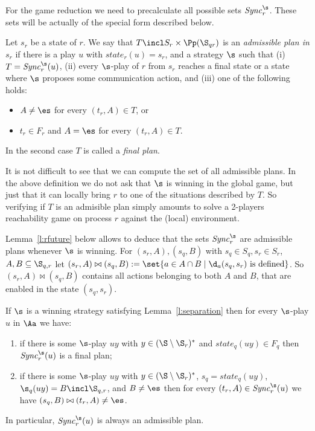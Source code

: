 \documentclass{llncs}
\newcommand{\Sync}{\mathit{Sync}}
\newcommand{\state}{\mathit{state}}
\begin{document}
For the game reduction we need to precalculate all possible sets
$\Sync^\s_r$. These sets will be actually of the special form
described below. 


\begin{definition}
  Let $s_r$ be a state of $r$.  We say that $T\incl
  S_r\times\Pp(\S_{qr})$ is an \emph{admissible plan in $s_r$} if
  there is a play $u$ with $\state_r(u)=s_r$, and a strategy $\s$ such
  that (i) $T=\Sync^\s_r(u)$, (ii) every $\s$-play of $r$ from $s_r$
  reaches a final state or a state where $\s$ proposes some communication
  action, and (iii) one of the following holds:
  \begin{itemize}
  \item $A\not=\es$ for every $(t_r,A)\in T$, or
    \item $t_r \in F_r$ and $A=\es$ for every $(t_r,A)\in T$.
  \end{itemize}
  In the second case $T$ is called a \emph{final plan}.
\end{definition}


It is not difficult to see that we can compute the set of all
admissible plans. In the above definition we do not ask that $\s$ is
winning in the global game, but just that it can locally bring $r$ to one
of the situations described by $T$. So verifying if $T$ is an
admisible plan simply amounts  to solve a 2-players reachability game on process
$r$ against the (local) environment.

Lemma~\ref{l:rfuture} below allows to deduce that the sets $\Sync_r^\s$
are admissible plans whenever $\s$ is winning. For $(s_r,A), (s_q,B)$ with $s_q \in S_q, s_r \in
S_r$, $A,B \subseteq \S_{q,r}$ let $(s_r,A) \bowtie (s_q,B):=\set{a
  \in A \cap B \mid \d_a(s_q,s_r) \text{ is defined}}$. So $(s_r,A)
\bowtie (s_q,B)$ contains all actions belonging to both $A$ and $B$,
that are enabled in the state $(s_q,s_r)$.



\begin{lemma}\label{l:rfuture}
  If $\s$ is a winning strategy 
  satisfying Lemma~\ref{l:separation} then for every $\s$-play $u$ in $\Aa$ we have:
  \begin{enumerate}
  \item if there is some $\s$-play $uy$ with $y\in(\S \setminus \S_r)^*$ and
    $\state_q(uy)\in F_q$  then $\Sync^\s_r(u)$ is a final plan;
  \item if there is some $\s$-play $uy$ with $y\in(\S \setminus
    \S_r)^*$, $s_q=\state_q(uy)$, $\s_q(uy)=B\incl \S_{q,r}$, and
    $B\not=\es$ then for every $(t_r,A)\in\Sync^\s_r(u)$ we have
    $(s_q,B) \bowtie (t_r, A)\not=\es$.
  \end{enumerate}
 In particular,  $\Sync^\s_r(u)$ is always an admissible plan.
\end{lemma}
\end{document}
